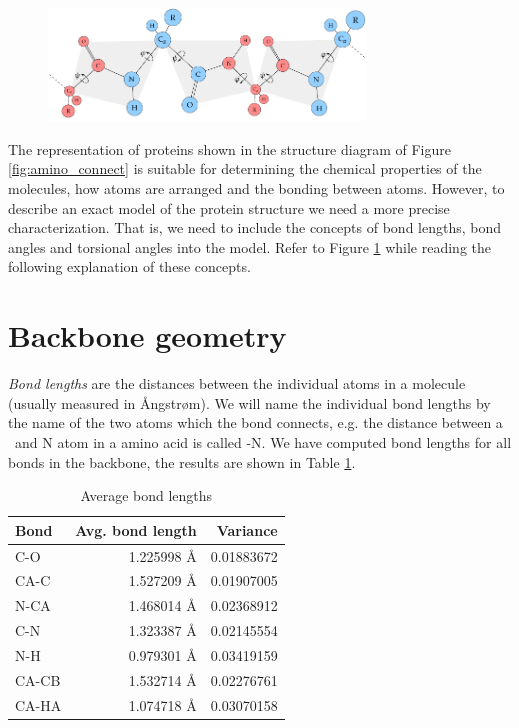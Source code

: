 \begin{figure}
  \centering
  \includegraphics[width=0.75\textwidth]{figures/protein-torsion-angles}
  \caption{}
  \label{fig:protein-torsion-angles}
\end{figure}

The representation of proteins shown in the structure diagram of
Figure \ref{fig:amino_connect} is suitable for determining the
chemical properties of the molecules, how atoms are arranged and the
bonding between atoms. However, to describe an exact model of the
protein structure we need a more precise characterization. That is, we
need to include the concepts of bond lengths, bond angles and
torsional angles into the model. Refer to Figure
\ref{fig:protein-torsion-angles} while reading the following
explanation of these concepts. 

\section{Backbone geometry}
\textit{Bond lengths} are the distances between the individual atoms
in a molecule (usually measured in Ångstrøm). We will name the
individual bond lengths by the name of the two atoms which the bond
connects, e.g. the distance between a \Ca\ and N atom in a amino acid
is called \Ca -N. We have computed bond lengths for all bonds in the
backbone, the results are shown in Table \ref{}.

\begin{table}
  \centering
  \begin{tabular}{lrr}
    \toprule
    Bond & Avg. bond length & Variance \\ \midrule
    C-O   & 1.225998 Å & 0.01883672\\
    CA-C  & 1.527209 Å & 0.01907005\\
    N-CA  & 1.468014 Å & 0.02368912\\
    C-N   & 1.323387 Å & 0.02145554\\
    N-H   & 0.979301 Å & 0.03419159\\
    CA-CB & 1.532714 Å & 0.02276761\\
    CA-HA & 1.074718 Å & 0.03070158\\ \bottomrule
  \end{tabular}
  \vspace{1mm}
  \caption{Average bond lengths}
  \label{tab:average_bond_lengths}
\end{table}

